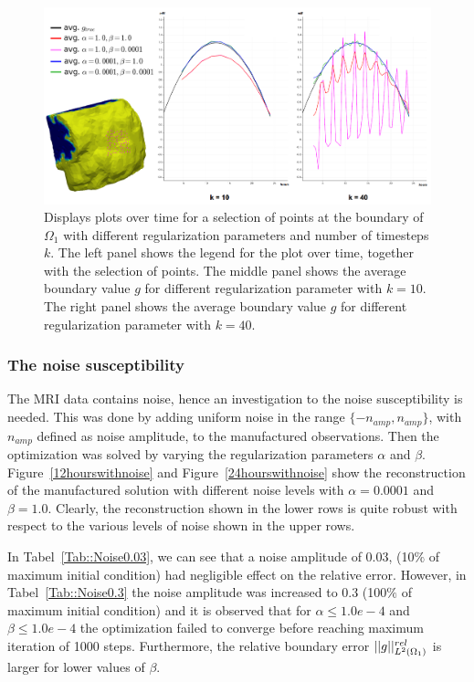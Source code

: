 \documentclass[11pt,a4paper]{article}
\begin{document}
\begin{figure}
\centering
\includegraphics[scale=0.2]{boundary_control.png}  
\caption{ Displays plots over time for a selection of points at the boundary of $\Omega_1$ with different regularization parameters and number of timesteps $k$. The left panel shows the legend for the plot over time, together with the selection of points. The middle panel shows the average boundary value $g$ for different regularization parameter with $k=10$. The right panel shows the average boundary value $g$ for different regularization parameter with $k=40$. }
\label{boundarycontrol}
\end{figure}

\subsubsection{The noise susceptibility}
The MRI data contains noise, hence an investigation to the noise susceptibility is needed. This was done by adding uniform noise in the range $\lbrace -n_{amp} , n_{amp} \rbrace $, with $n_{amp}$ defined as noise amplitude, to the manufactured observations. Then the optimization was solved by varying the regularization parameters $\alpha$ and $\beta$. Figure~\ref{12hourswithnoise} and Figure~\ref{24hourswithnoise} show the reconstruction of the manufactured solution with 
different noise levels with $\alpha=0.0001$ and $\beta=1.0$. Clearly, the reconstruction shown in the lower rows is quite robust with respect to the various levels
of noise shown in the upper rows.      

In Tabel~\ref{Tab::Noise0.03}, we can see that a noise amplitude of 0.03, (10$\%$ of maximum initial condition) had negligible effect on the relative error. However, in Tabel~\ref{Tab::Noise0.3} the noise amplitude was increased to 0.3 (100$\%$ of maximum initial condition) and it is observed that for  $\alpha \leq 1.0e-4$  and $\beta \leq 1.0e-4$ the optimization failed to converge before reaching maximum iteration of 1000 steps. Furthermore, the relative boundary error $||g||\sp{rel}_{L\sp{2}(\Omega_1)}$ is larger for lower values of $\beta$.  
\end{document}
